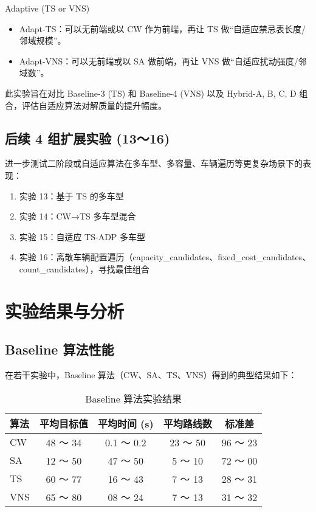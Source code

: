 \documentclass[12pt,a4paper,twoside]{ctexbook}
\begin{document}
{Adaptive (TS or VNS)}
\begin{itemize}
    \item Adapt-TS：可以无前端或以 CW 作为前端，再让 TS 做“自适应禁忌表长度/邻域规模”。
    \item Adapt-VNS：可以无前端或以 SA 做前端，再让 VNS 做“自适应扰动强度/邻域数”。
\end{itemize}
此实验旨在对比 Baseline-3 (TS) 和 Baseline-4 (VNS) 以及 Hybrid-A, B, C, D 组合，评估自适应算法对解质量的提升幅度。

\subsection{后续 4 组扩展实验 (13～16)}
进一步测试二阶段或自适应算法在多车型、多容量、车辆遍历等更复杂场景下的表现：
\begin{enumerate}
    \item 实验 13：基于 TS 的多车型
    \item 实验 14：CW→TS 多车型混合
    \item 实验 15：自适应 TS-ADP 多车型
    \item 实验 16：离散车辆配置遍历（capacity\_candidates、fixed\_cost\_candidates、count\_candidates），寻找最佳组合
\end{enumerate}

\section{实验结果与分析}
\subsection{Baseline 算法性能}
在若干实验中，Baseline 算法（CW、SA、TS、VNS）得到的典型结果如下：
\begin{table}[H]
    \centering
    \begin{tabular}{lcccc}
        \hline
        算法 & 平均目标值 & 平均时间 (s) & 平均路线数 & 标准差 \\
        \hline
        CW & 48 ～ 34 & 0.1 ～ 0.2 & 23 ～ 50 & 96 ～ 23 \\
        SA & 12 ～ 50 & 47 ～ 50 & 5 ～ 10 & 72 ～ 00 \\
        TS & 60 ～ 77 & 16 ～ 43 & 7 ～ 13 & 28 ～ 31 \\
        VNS & 65 ～ 80 & 08 ～ 24 & 7 ～ 13 & 31 ～ 32 \\
        \hline
    \end{tabular}
    \caption{Baseline 算法实验结果}
\end{table}
\end{document}
